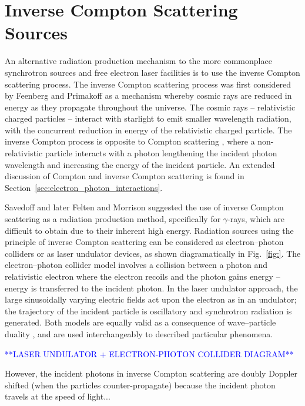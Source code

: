\documentclass[../main.tex]{subfiles}
\begin{document}
\section{Inverse Compton Scattering Sources}
An alternative radiation production mechanism to the more commonplace synchrotron sources and free electron laser facilities is to use the inverse Compton scattering process. The inverse Compton scattering process was first considered by Feenberg and Primakoff \cite{feenberg1948interaction} as a mechanism whereby cosmic rays are reduced in energy as they propagate throughout the universe. The cosmic rays -- relativistic charged particles -- interact with starlight to emit smaller wavelength radiation, with the concurrent reduction in energy of the relativistic charged particle. The inverse Compton process is opposite to Compton scattering \cite{compton1923quantum}, where a non-relativistic particle interacts with a photon lengthening the incident photon wavelength and increasing the energy of the incident particle. An extended discussion of Compton and inverse Compton scattering is found in Section~\ref{sec:electron_photon_interactions}. 

Savedoff \cite{savedoff1959crab} and later Felten and Morrison \cite{felten1963recoil} suggested the use of inverse Compton scattering as a radiation production method, specifically for $\gamma$-rays, which are difficult to obtain due to their inherent high energy. Radiation sources using the principle of inverse Compton scattering can be considered as electron--photon colliders or as laser undulator devices, as shown diagramatically in Fig.~\ref{fig:}. The electron--photon collider model involves a collision between a photon and relativistic electron where the electron recoils and the photon gains energy -- energy is transferred to the incident photon. In the laser undulator approach, the large sinusoidally varying electric fields act upon the electron as in an undulator; the trajectory of the incident particle is oscillatory and synchrotron radiation is generated. Both models are equally valid as a consequence of wave--particle duality \cite{de1923waves}, and are used interchangeably to described particular phenomena.

\textcolor{blue}{**LASER UNDULATOR + ELECTRON-PHOTON COLLIDER DIAGRAM**}

However, the incident photons in inverse Compton scattering are doubly Doppler shifted (when the particles counter-propagate) because the incident photon travels at the speed of light...  
\end{document}
